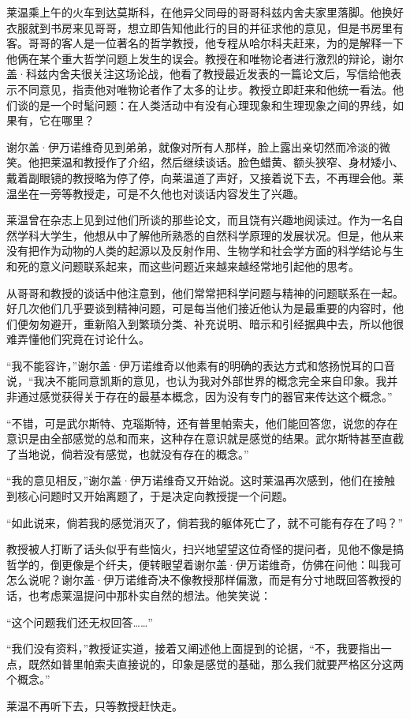 \par 莱温乘上午的火车到达莫斯科，在他异父同母的哥哥科兹内舍夫家里落脚。他换好衣服就到书房来见哥哥，想立即告知他此行的目的并征求他的意见，但是书房里有客。哥哥的客人是一位著名的哲学教授，他专程从哈尔科夫赶来，为的是解释一下他俩在某个重大哲学问题上发生的误会。教授在和唯物论者进行激烈的辩论，谢尔盖·科兹内舍夫很关注这场论战，他看了教授最近发表的一篇论文后，写信给他表示不同意见，指责他对唯物论者作了太多的让步。教授立即赶来和他统一看法。他们谈的是一个时髦问题：在人类活动中有没有心理现象和生理现象之间的界线，如果有，它在哪里？
\par 谢尔盖·伊万诺维奇见到弟弟，就像对所有人那样，脸上露出亲切然而冷淡的微笑。他把莱温和教授作了介绍，然后继续谈话。脸色蜡黄、额头狭窄、身材矮小、戴着副眼镜的教授略为停了停，向莱温道了声好，又接着说下去，不再理会他。莱温坐在一旁等教授走，可是不久他也对谈话内容发生了兴趣。
\par 莱温曾在杂志上见到过他们所谈的那些论文，而且饶有兴趣地阅读过。作为一名自然学科大学生，他想从中了解他所熟悉的自然科学原理的发展状况。但是，他从来没有把作为动物的人类的起源以及反射作用、生物学和社会学方面的科学结论与生和死的意义问题联系起来，而这些问题近来越来越经常地引起他的思考。
\par 从哥哥和教授的谈话中他注意到，他们常常把科学问题与精神的问题联系在一起。好几次他们几乎要谈到精神问题，可是每当他们接近他认为是最重要的内容时，他们便匆匆避开，重新陷入到繁琐分类、补充说明、暗示和引经据典中去，所以他很难弄懂他们究竟在讨论什么。
\par “我不能容许，”谢尔盖·伊万诺维奇以他素有的明确的表达方式和悠扬悦耳的口音说，“我决不能同意凯斯的意见，也认为我对外部世界的概念完全来自印象。我并非通过感觉获得关于存在的最基本概念，因为没有专门的器官来传达这个概念。”
\par “不错，可是武尔斯特、克瑙斯特，还有普里帕索夫，他们能回答您，说您的存在意识是由全部感觉的总和而来，这种存在意识就是感觉的结果。武尔斯特甚至直截了当地说，倘若没有感觉，也就没有存在的概念。”
\par “我的意见相反，”谢尔盖·伊万诺维奇又开始说。这时莱温再次感到，他们在接触到核心问题时又开始离题了，于是决定向教授提一个问题。
\par “如此说来，倘若我的感觉消灭了，倘若我的躯体死亡了，就不可能有存在了吗？”
\par 教授被人打断了话头似乎有些恼火，扫兴地望望这位奇怪的提问者，见他不像是搞哲学的，倒更像是个纤夫，便转眼望着谢尔盖·伊万诺维奇，仿佛在问他：叫我可怎么说呢？谢尔盖·伊万诺维奇决不像教授那样偏激，而是有分寸地既回答教授的话，也考虑莱温提问中那朴实自然的想法。他笑笑说：
\par “这个问题我们还无权回答……”
\par “我们没有资料，”教授证实道，接着又阐述他上面提到的论据，“不，我要指出一点，既然如普里帕索夫直接说的，印象是感觉的基础，那么我们就要严格区分这两个概念。”
\par 莱温不再听下去，只等教授赶快走。


